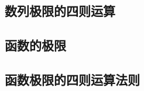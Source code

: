 \subsection{数列极限的四则运算}
\begin{Practice}
  \begin{question}
    \item 
    \item 
    \item 
  \end{question}
\end{Practice}

\begin{Exercise}
  \begin{question}
    \item 
    \item 
    \item 
    \item 
    \item 
    \item 
    \item 
    \item 
    \item 
    \item 
    \item 
    \item 
    \item 
    \item 
    \item 
  \end{question}
\end{Exercise}

\subsection{函数的极限}

\begin{Practice}
  \begin{question}
    \item 
    \item 
    \item 
    \item 
    \item 
  \end{question}
\end{Practice}
\subsection{函数极限的四则运算法则}
\begin{Practice}
  \begin{question}
    \item 
    \item 
  \end{question}
\end{Practice}

